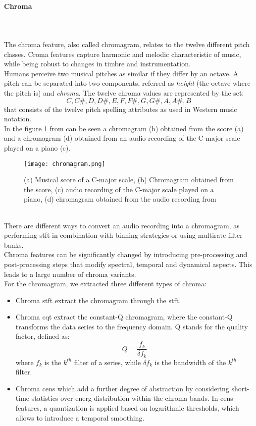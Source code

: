 \paragraph{Chroma}
\mbox{} \\ \\
The chroma feature, also called chromagram, relates to the twelve different pitch classes. Croma features capture harmonic and melodic characteristic of music, while being robust to changes in timbre and instrumentation.
\\
Humans perceive two musical pitches as similar if they differ by an octave. A pitch can be separated into two components, referred as \textit{height} (the octave where the pitch is) and \textit{chroma}. The twelve chroma values are represented by the set:
\[{C, C\#, D, D\#, E , F, F\#, G, G\#, A, A\#, B}\]
that consists of the twelve pitch spelling attributes as used in Western music notation.
\\
In the figure \ref{fig:chromagram} from \cite{inproceedings} can be seen a chromagram (b) obtained from the score (a) and a chromagram (d) obtained from an audio recording of the C-major scale played on a piano (c).
\begin{figure}[h]
    \centering
    \texttt{[image: chromagram.png]} 
	\caption{(a) Musical score of a C-major scale, (b) Chromagram obtained from the score, (c) audio recording of the C-major scale played on a piano, (d) chromagram obtained from the audio recording from \cite{inproceedings}}
    \label{fig:chromagram}
\end{figure}
\\
There are different ways to convert an audio recording into a chromagram, as performing \gls{stft} in combination with binning strategies or using multirate filter banks.
\\ \indent
Chroma features can be significantly changed by introducing pre-processing and post-processing steps that modify spectral, temporal and dynamical aspects. This leads to a large number of chroma variants.
\\
For the chromagram, we extracted three different types of chroma:
\begin{itemize}
	\item Chroma \gls{stft} extract the chromagram through the \gls{stft}.
	\item Chroma cqt extract the constant-Q chromagram, where the constant-Q transforms the data series to the frequency domain. Q stands for the quality factor, defined as:
	\begin{equation}
		Q=\dfrac{f_k}{\delta f_k}
	\end{equation}
	where $f_k$ is the $k^{th}$ filter of a series, while $\delta f_k$ is the bandwidth of the $k^{th}$ filter.
	\item Chroma cens which add a further degree of abstraction by considering short-time statistics over energ distribution within the chroma bands. In \gls{cens} features, a quantization is applied based on logarithmic thresholds, which allows to introduce a temporal smoothing.
\end{itemize}

